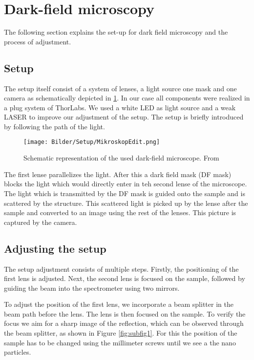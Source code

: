 \section{Dark-field microscopy}
\label{sec:DarkFMicro}

The following section explains the set-up for dark field microscopy and the process of adjustment. 

\subsection{Setup}

The setup itself consist of a system of lenses, a light source one mask and one camera as schematically depicted in \cref{fig:DarkFMicro}. 
In our case all components were realized in a plug system of ThorLabs. We used a white LED as light source and a weak LASER to improve our adjustment of the setup. 
The setup is briefly introduced by following the path of the light. 

\begin{figure}[ht]
    \centering
    \texttt{[image: Bilder/Setup/MikroskopEdit.png]}
    \caption{Schematic representation of the used dark-field microscope. From \cite{LehrstuhlExperimentalphysikIII.2023}}
    \label{fig:DarkFMicro}
\end{figure}

The first lense parallelizes the light. After this a dark field mask (DF mask) blocks the light which would directly enter in teh second lense of the microscope. The light which is transmitted by the DF mask is guided onto the sample and 
is scattered by the structure. This scattered light is picked up by the lense after the sample and converted to an image using the rest of the lenses. This picture is captured by the camera.

\subsection{Adjusting the setup}

The setup adjustment consists of multiple steps. Firstly, the positioning of the first lens is adjusted. Next, the second lens is focused on the sample, followed by guiding the beam into the spectrometer using two mirrors.

To adjust the position of the first lens, we incorporate a beam splitter in the beam path before the lens. The lens is then focused on the sample. To verify the focus we aim for a sharp image of the reflection, which can be observed through the beam splitter, as shown in Figure \ref{fig:subfig1}.
For this the position of the sample has to be changed using the millimeter screws until we see a the nano particles.


